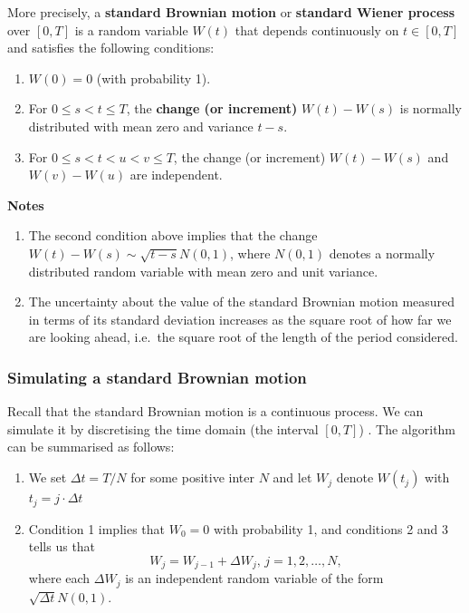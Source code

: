 \documentclass[
]{book}
\theoremstyle{definition}
\theoremstyle{definition}
\theoremstyle{definition}
\theoremstyle{definition}
\theoremstyle{remark}
\begin{document}
More precisely, a \textbf{standard Brownian motion} or \textbf{standard Wiener
process} over \([0,T]\) is a random variable \(W(t)\) that depends
continuously on \(t \in [0,T]\) and satisfies the following conditions:

\begin{enumerate}
\def\labelenumi{\arabic{enumi}.}
\item
  \(W(0) = 0\) (with probability 1).
\item
  For \(0 \le s < t \le T\), the \textbf{change (or increment)} \(W(t) - W(s)\)
  is normally distributed with mean zero and variance \(t -s\).
\item
  For \(0 \le s < t < u < v \le T\), the change (or increment)
  \(W(t) - W(s)\) and \(W(v) - W(u)\) are independent.
\end{enumerate}

\textbf{Notes}

\begin{enumerate}
\def\labelenumi{\arabic{enumi}.}
\item
  The second condition above implies that the change
  \(W(t) - W(s) \sim \sqrt{t-s} N(0,1)\), where \(N(0,1)\) denotes a
  normally distributed random variable with mean zero and unit
  variance.
\item
  The uncertainty about the value of the standard Brownian motion
  measured in terms of its standard deviation increases as the square
  root of how far we are looking ahead, i.e.~the square root of the
  length of the period considered.
\end{enumerate}

\hypertarget{simulating-a-standard-brownian-motion}{%
\subsubsection{Simulating a standard Brownian motion}\label{simulating-a-standard-brownian-motion}}

Recall that the standard Brownian motion is a continuous process. We can
simulate it by discretising the time domain (the interval \([0,T]\)) . The
algorithm can be summarised as follows:

\begin{enumerate}
\def\labelenumi{\arabic{enumi}.}
\item
  We set \(\Delta t = T/N\) for some positive inter \(N\) and let \(W_j\)
  denote \(W(t_j)\) with \(t_j = j \cdot \Delta t\)
\item
  Condition 1 implies that \(W_0 = 0\) with probability 1, and
  conditions 2 and 3 tells us that
  \[W_j = W_{j-1} + \Delta W_j, \, j = 1,2, \ldots, N,\] where each
  \(\Delta W_j\) is an independent random variable of the form
  \(\sqrt{\Delta t} N(0,1)\).
\end{enumerate}
\end{document}
